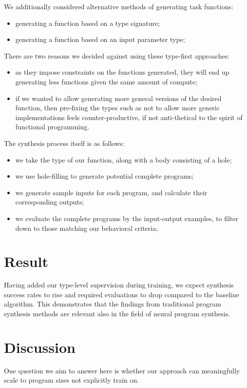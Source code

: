 \documentclass{article}
\begin{document}
We additionally considered alternative methods of generating task functions:
\begin{itemize}
    \item generating a function based on a type signature;
    \item generating a function based on an input parameter type; %
\end{itemize}
There are two reasons we decided against using these type-first approaches:
\begin{itemize}
    \item as they impose constraints on the functions generated, they will end up generating less functions given the same amount of compute;
    \item if we wanted to allow generating more general versions of the desired function, then pre-fixing the types such as not to allow more generic implementations feels counter-productive, if not anti-thetical to the spirit of functional programming.
\end{itemize}

The synthesis process itself is as follows:
\begin{itemize}
    \item we take the type of our function, along with a body consisting of a hole;
    \item we use hole-filling to generate potential complete programs;
    \item we generate sample inputs for each program, and calculate their corresponding outputs;
    \item we evaluate the complete programs by the input-output examples, to filter down to those matching our behavioral criteria;
\end{itemize}


\section{Result}

Having added our type-level supervision during training, we expect synthesis success rates to rise and required evaluations to drop compared to the baseline algorithm.
This demonstrates that the findings from traditional program synthesis methods are relevant also in the field of neural program synthesis.


\section{Discussion}

One question we aim to answer here is whether our approach can meaningfully scale to program sizes not explicitly train on.

\nocite{*}


\end{document}
